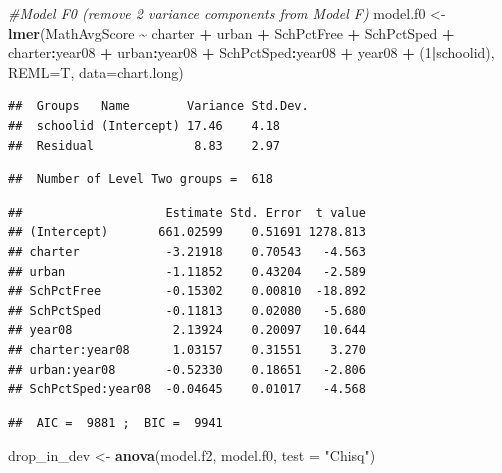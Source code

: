 \documentclass[
]{krantz}
\newenvironment{Shaded}{\begin{snugshade}}{\end{snugshade}}
\newcommand{\AttributeTok}[1]{\textcolor[rgb]{0.27,0.27,0.27}{#1}}
\newcommand{\CommentTok}[1]{\textcolor[rgb]{0.37,0.37,0.37}{\textit{#1}}}
\newcommand{\DecValTok}[1]{\textcolor[rgb]{0.06,0.06,0.06}{#1}}
\newcommand{\FunctionTok}[1]{\textcolor[rgb]{0.27,0.27,0.27}{\textbf{#1}}}
\newcommand{\NormalTok}[1]{#1}
\newcommand{\OtherTok}[1]{\textcolor[rgb]{0.37,0.37,0.37}{#1}}
\newcommand{\SpecialCharTok}[1]{\textcolor[rgb]{0.43,0.43,0.43}{\textbf{#1}}}
\newcommand{\StringTok}[1]{\textcolor[rgb]{0.5,0.5,0.5}{#1}}
\begin{document}
\begin{Shaded}
\begin{Highlighting}[]
\CommentTok{\#Model F0 (remove 2 variance components from Model F)}
\NormalTok{model.f0 }\OtherTok{\textless{}{-}} \FunctionTok{lmer}\NormalTok{(MathAvgScore }\SpecialCharTok{\textasciitilde{}}\NormalTok{ charter }\SpecialCharTok{+}\NormalTok{ urban }\SpecialCharTok{+}\NormalTok{ SchPctFree }\SpecialCharTok{+} 
\NormalTok{  SchPctSped }\SpecialCharTok{+}\NormalTok{ charter}\SpecialCharTok{:}\NormalTok{year08 }\SpecialCharTok{+}\NormalTok{ urban}\SpecialCharTok{:}\NormalTok{year08 }\SpecialCharTok{+} 
\NormalTok{  SchPctSped}\SpecialCharTok{:}\NormalTok{year08 }\SpecialCharTok{+}\NormalTok{ year08 }\SpecialCharTok{+}
\NormalTok{  (}\DecValTok{1}\SpecialCharTok{|}\NormalTok{schoolid), }\AttributeTok{REML=}\NormalTok{T, }\AttributeTok{data=}\NormalTok{chart.long)}
\end{Highlighting}
\end{Shaded}

\begin{verbatim}
##  Groups   Name        Variance Std.Dev.
##  schoolid (Intercept) 17.46    4.18    
##  Residual              8.83    2.97
\end{verbatim}

\begin{verbatim}
##  Number of Level Two groups =  618
\end{verbatim}

\begin{verbatim}
##                    Estimate Std. Error  t value
## (Intercept)       661.02599    0.51691 1278.813
## charter            -3.21918    0.70543   -4.563
## urban              -1.11852    0.43204   -2.589
## SchPctFree         -0.15302    0.00810  -18.892
## SchPctSped         -0.11813    0.02080   -5.680
## year08              2.13924    0.20097   10.644
## charter:year08      1.03157    0.31551    3.270
## urban:year08       -0.52330    0.18651   -2.806
## SchPctSped:year08  -0.04645    0.01017   -4.568
\end{verbatim}

\begin{verbatim}
##  AIC =  9881 ;  BIC =  9941
\end{verbatim}

\begin{Shaded}
\begin{Highlighting}[]
\NormalTok{drop\_in\_dev }\OtherTok{\textless{}{-}} \FunctionTok{anova}\NormalTok{(model.f2, model.f0, }\AttributeTok{test =} \StringTok{"Chisq"}\NormalTok{)}
\end{Highlighting}
\end{Shaded}
\end{document}
